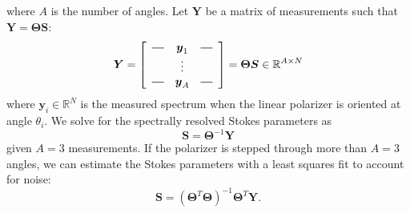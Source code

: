\documentclass[10pt]{article}
\numberwithin{equation}{subsection}
\newcommand{\lbf}[1]{\ensuremath{{\boldsymbol #1}}}
\begin{document}
    where $A$ is the number of angles.
Let $\lbf Y$ be a matrix of measurements such that $\lbf Y = \lbf \Theta \lbf S$:
    \begin{equation}
        \lbf Y = \left[ \begin{array}{ccc}
            \horzbar & \lbf y_1 & \horzbar \\
              & \vdots & \\
            \horzbar & \lbf y_A & \horzbar \\
        \end{array} \right] = \lbf \Theta \lbf S \in \mathbb R^{A \times N}
    \end{equation}
    where $\lbf y_i \in \mathbb R^N$ is the measured spectrum when the linear polarizer is oriented at angle $\theta_i$.
We solve for the spectrally resolved Stokes parameters as
    \begin{equation}
        \lbf S = \lbf \Theta^{-1} \lbf Y
    \end{equation}
given $A = 3$ measurements.
If the polarizer is stepped through more than $A = 3$ angles, we can estimate the Stokes parameters with a least squares fit to account for noise:
    \begin{equation}
        \lbf S = \left(\lbf \Theta^T \lbf \Theta \right)^{-1} \lbf \Theta^T \lbf Y.
    \end{equation}

\end{document}
